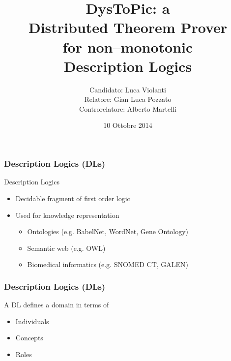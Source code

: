 \documentclass[serif,mathserif]{beamer}
\author[Luca Violanti]{Candidato: Luca Violanti\\Relatore: Gian Luca Pozzato\\Controrelatore: Alberto Martelli}
\title[DysToPic\hspace{2em}\insertframenumber/\inserttotalframenumber]{\textbf{DysToPic}: a \\ Distributed Theorem Prover\\for non--monotonic\\Description Logics}
\date{10 Ottobre 2014} %
\institute{Università degli studi di Torino - Dipartimento di Informatica}
\begin{document}
\maketitle

\begin{frame}
	\frametitle{Description Logics (DLs)}
	
	\begin{block}{Description Logics}
	\begin{itemize}
	\item Decidable fragment of first order logic
  	\item Used for knowledge representation
		\begin{itemize}
			\item Ontologies (e.g. BabelNet, WordNet, Gene Ontology)
			\item Semantic web (e.g. OWL)
			\item Biomedical informatics (e.g. SNOMED CT, GALEN)
		\end{itemize}
	\end{itemize}
	\end{block}
	
\end{frame}

\begin{frame}
  \frametitle{Description Logics (DLs)}
  A DL defines a domain in terms of
  \begin{itemize}
  \item Individuals
  \item Concepts
  \item Roles
  \end{itemize}
\end{frame}
\end{document}
